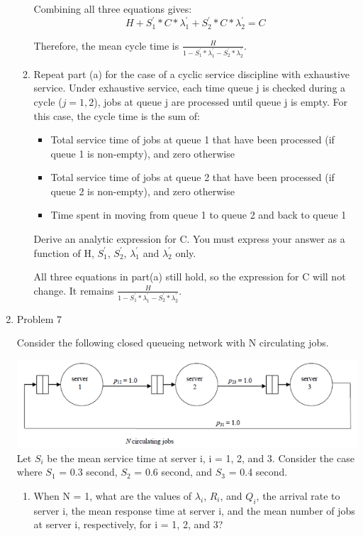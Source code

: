 \documentclass[letterpaper]{article}
\begin{document}
\begin{enumerate}
\begin{enumerate}
Combining all three equations gives:
\begin{equation}
H + S_1^{'} * C * \lambda_1^{'} + S_2^{'} * C * \lambda_2^{'} = C
\end{equation}

Therefore, the mean cycle time is $\frac{H}{1 - S_1^{'} * \lambda_1^{'} - S_2^{'} * \lambda_2^{'}}$.

\item{} Repeat part (a) for the case of a cyclic service discipline with exhaustive service. Under exhaustive
service, each time queue j is checked during a cycle ($j = 1, 2$), jobs at queue j are processed until queue
j is empty. For this case, the cycle time is the sum of:
\begin{itemize}
\item{} Total service time of jobs at queue 1 that have been processed (if queue 1 is non-empty), and zero otherwise
\item{} Total service time of jobs at queue 2 that have been processed (if queue 2 is non-empty), and zero otherwise
\item{} Time spent in moving from queue 1 to queue 2 and back to queue 1
\end{itemize}
Derive an analytic expression for C. You must express your answer as a function of H, $S_1^{'}$, $S_2^{'}$, $\lambda_1^{'}$ and $\lambda_2^{'}$ only.

All three equations in part(a) still hold, so the expression for C will not change. It remains $\frac{H}{1 - S_1^{'} * \lambda_1^{'} - S_2^{'} * \lambda_2^{'}}$.
\end{enumerate}
\medskip

\item{Problem 7}

Consider the following closed queueing network with N circulating jobs.

\includegraphics{a1q7.png}
Let $S_i$ be the mean service time at server i, i = 1, 2, and 3. Consider the case where $S_1$ = 0.3 second, $S_2$ = 0.6 second, and $S_3$ = 0.4 second.
\begin{enumerate}
\item{} When N = 1, what are the values of $\lambda_i$, $R_i$, and $Q_i$, the arrival rate to server i, the mean response time at server i, and the mean number of jobs at server i, respectively, for i = 1, 2, and 3?


\end{enumerate}
\end{enumerate}
\end{document}
